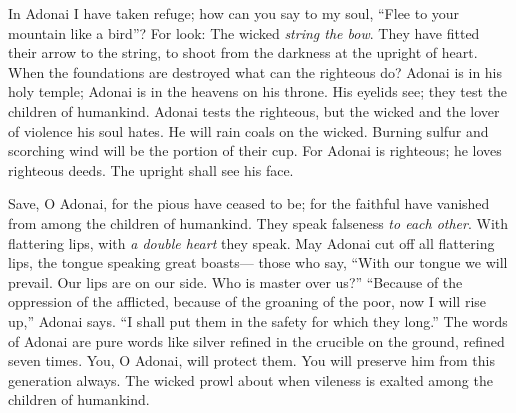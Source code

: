 \begin{biblechapter} %
 In Adonai I have taken refuge; 
how can you say to my soul, 
“Flee to your mountain like a bird”?
\verse For look: The wicked \textit{string the bow}. 
They have fitted their arrow to the string, 
to shoot from the darkness 
at the upright of heart.
\verse When the foundations are destroyed 
what can the righteous do?
\verse Adonai is in his holy temple; 
Adonai is in the heavens on his throne. 
His eyelids see; 
they test the children of humankind.
\verse Adonai tests the righteous, 
but the wicked and the lover of violence 
his soul hates.
\verse He will rain coals on the wicked. 
Burning sulfur and scorching wind 
will be the portion of their cup.
\verse For Adonai is righteous; 
he loves righteous deeds. 
The upright shall see his face.
\end{biblechapter}

\begin{biblechapter} %
 Save, O Adonai, for the pious have ceased to be; 
for the faithful have vanished 
from among the children of humankind.
\verse They speak falseness \textit{to each other}. 
With flattering lips, 
with \textit{a double heart} they speak.
\verse May Adonai cut off all flattering lips, 
the tongue speaking great boasts—
\verse those who say, “With our tongue we will prevail. 
Our lips are on our side. 
Who is master over us?”
\verse “Because of the oppression of the afflicted, 
because of the groaning of the poor, 
now I will rise up,” Adonai says. 
“I shall put them in the safety for which they long.”
\verse The words of Adonai are pure words 
like silver refined in the crucible on the ground, 
refined seven times.
\verse You, O Adonai, will protect them. 
You will preserve him 
from this generation always.
\verse The wicked prowl about 
when vileness is exalted among the children of humankind.
\end{biblechapter}

